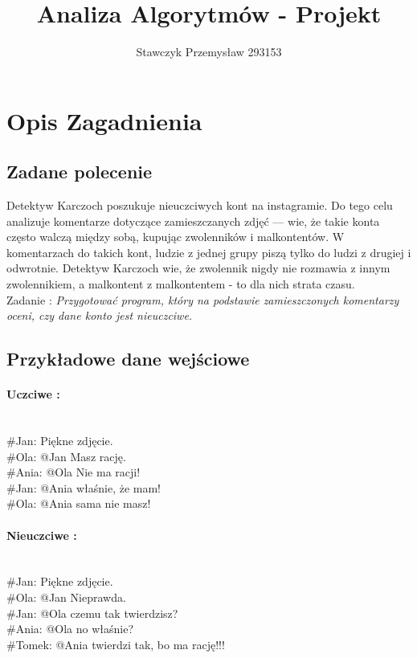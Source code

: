 \documentclass[11pt]{article}
\title{Analiza Algorytmów - Projekt}
\author{Stawczyk Przemysław 293153}
\date{} %
\newcommand{\+}{\discretionary{\mbox{\scriptsize$\hookleftarrow$}}{}{}}
\begin{document}
	  \hypersetup{pageanchor=false,
		bookmarksnumbered=true,
		pdfencoding=unicode
	}
	\maketitle
	\setcounter{secnumdepth}{3}
	\setcounter{tocdepth}{3}
	\tableofcontents
	\clearpage

\section{Opis Zagadnienia}
\subsection{Zadane polecenie}
    Detektyw Karczoch poszukuje nieuczciwych kont na instagramie. Do tego celu analizuje komentarze dotyczące zamieszczanych zdjęć — wie, że takie konta często walczą między sobą, kupując zwolenników i malkontentów. W komentarzach do takich kont, ludzie z jednej grupy piszą tylko do ludzi z drugiej i odwrotnie. Detektyw Karczoch wie, że zwolennik nigdy nie rozmawia z innym zwolennikiem, a malkontent z malkontentem - to dla nich strata czasu.\\
    
	Zadanie : \textsl{Przygotować program, który na podstawie zamieszczonych komentarzy oceni, czy dane konto jest nieuczciwe.}

\subsection{Przykładowe dane wejściowe}

\paragraph{Uczciwe :}
\begin{texttt}\\
  \#Jan: Piękne zdjęcie.\\
  \#Ola: @Jan Masz rację.\\
  \#Ania: @Ola Nie ma racji!\\
  \#Jan: @Ania właśnie, że mam!\\
  \#Ola: @Ania sama nie masz!\\
\end{texttt}
\paragraph{Nieuczciwe : }
\begin{texttt}\\
   \#Jan: Piękne zdjęcie.\\
   \#Ola: @Jan Nieprawda.\\
   \#Jan: @Ola czemu tak twierdzisz?\\
   \#Ania: @Ola no właśnie?\\
   \#Tomek: @Ania twierdzi tak, bo ma rację!!!\\
\end{texttt}
\end{document}
